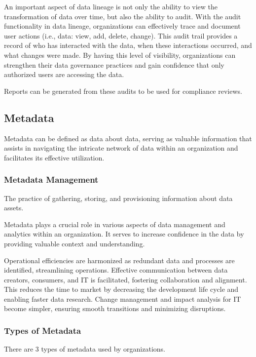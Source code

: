 An important aspect of data lineage is not only the ability to view the transformation of data over time, but also the ability to audit. With the audit functionality in data lineage, organizations can effectively trace and document user actions (i.e., data: view, add, delete, change). This audit trail provides a record of who has interacted with the data, when these interactions occurred, and what changes were made. By having this level of visibility, organizations can strengthen their data governance practices and gain confidence that only authorized users are accessing the data. 

Reports can be generated from these audits to be used for compliance reviews. 

\subsection{Metadata}
Metadata can be defined as data about data, serving as valuable information that assists in navigating the intricate network of data within an organization and facilitates its effective utilization.

\subsubsection{Metadata Management}
The practice of gathering, storing, and provisioning information about data assets.

Metadata plays a crucial role in various aspects of data management and analytics within an organization. It serves to increase confidence in the data by providing valuable context and understanding. 

Operational efficiencies are harmonized as redundant data and processes are identified, streamlining operations. Effective communication between data creators, consumers, and IT is facilitated, fostering collaboration and alignment. This reduces the time to market by decreasing the development life cycle and enabling faster data research. Change management and impact analysis for IT become simpler, ensuring smooth transitions and minimizing disruptions. 

\subsubsection{Types of Metadata}
There are 3 types of metadata used by organizations.

